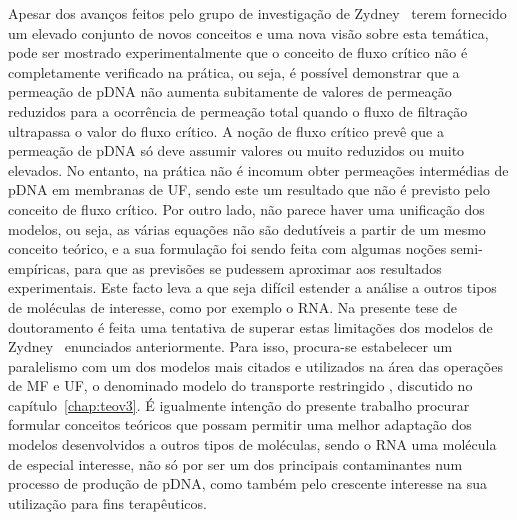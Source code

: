 Apesar dos avanços feitos pelo grupo de investigação de Zydney \et\ terem fornecido um elevado conjunto de novos conceitos e uma nova visão sobre esta temática, pode ser mostrado experimentalmente que o conceito de fluxo crítico não é completamente verificado na prática, ou seja, é possível demonstrar que a permeação de pDNA não aumenta subitamente de valores de permeação reduzidos para a ocorrência de permeação total quando o fluxo de filtração ultrapassa o valor do fluxo crítico. A noção de fluxo crítico prevê que a permeação de pDNA só deve assumir valores ou muito reduzidos ou muito elevados. No entanto, na prática não é incomum obter permeações intermédias de pDNA em membranas de UF, sendo este um resultado que não é previsto pelo conceito de fluxo crítico. Por outro lado, não parece haver uma unificação dos modelos, ou seja, as várias equações não são dedutíveis a partir de um mesmo conceito teórico, e a sua formulação foi sendo feita com algumas noções semi-empíricas, para que as previsões se pudessem aproximar aos resultados experimentais. Este facto leva a que seja difícil estender a análise a outros tipos de moléculas de interesse, como por exemplo o RNA. Na presente tese de doutoramento é feita uma tentativa de superar estas limitações dos modelos de Zydney \et\ enunciados anteriormente. Para isso, procura-se estabelecer um paralelismo com um dos modelos mais citados e utilizados na área das operações de MF e UF, o denominado modelo do transporte restringido \cite{deen,dechadilok}, discutido no capítulo~\ref{chap:teov3}. 
É igualmente intenção do presente trabalho procurar formular conceitos teóricos que possam permitir uma melhor adaptação dos modelos desenvolvidos a outros tipos de moléculas, sendo o RNA uma molécula de especial interesse, não só por ser um dos principais contaminantes num processo de produção de pDNA, como também pelo crescente interesse na sua utilização para fins terapêuticos.  

